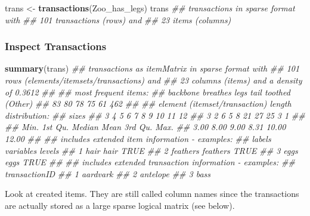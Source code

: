 \documentclass[
  notitlepage]{book}
\newenvironment{Shaded}{\begin{snugshade}}{\end{snugshade}}
\newcommand{\CommentTok}[1]{\textcolor[rgb]{0.56,0.35,0.01}{\textit{#1}}}
\newcommand{\KeywordTok}[1]{\textcolor[rgb]{0.13,0.29,0.53}{\textbf{#1}}}
\newcommand{\NormalTok}[1]{#1}
\newcommand{\StringTok}[1]{\textcolor[rgb]{0.31,0.60,0.02}{#1}}
\begin{document}
\begin{Shaded}
\begin{Highlighting}[]
\NormalTok{trans \textless{}{-}}\StringTok{ }\KeywordTok{transactions}\NormalTok{(Zoo\_has\_legs)}
\NormalTok{trans}
\CommentTok{\#\# transactions in sparse format with}
\CommentTok{\#\#  101 transactions (rows) and}
\CommentTok{\#\#  23 items (columns)}
\end{Highlighting}
\end{Shaded}

\hypertarget{inspect-transactions}{%
\subsubsection{Inspect Transactions}\label{inspect-transactions}}

\begin{Shaded}
\begin{Highlighting}[]
\KeywordTok{summary}\NormalTok{(trans)}
\CommentTok{\#\# transactions as itemMatrix in sparse format with}
\CommentTok{\#\#  101 rows (elements/itemsets/transactions) and}
\CommentTok{\#\#  23 columns (items) and a density of 0.3612 }
\CommentTok{\#\# }
\CommentTok{\#\# most frequent items:}
\CommentTok{\#\# backbone breathes     legs     tail  toothed  (Other) }
\CommentTok{\#\#       83       80       78       75       61      462 }
\CommentTok{\#\# }
\CommentTok{\#\# element (itemset/transaction) length distribution:}
\CommentTok{\#\# sizes}
\CommentTok{\#\#  3  4  5  6  7  8  9 10 11 12 }
\CommentTok{\#\#  3  2  6  5  8 21 27 25  3  1 }
\CommentTok{\#\# }
\CommentTok{\#\#    Min. 1st Qu.  Median    Mean 3rd Qu.    Max. }
\CommentTok{\#\#    3.00    8.00    9.00    8.31   10.00   12.00 }
\CommentTok{\#\# }
\CommentTok{\#\# includes extended item information {-} examples:}
\CommentTok{\#\#     labels variables levels}
\CommentTok{\#\# 1     hair      hair   TRUE}
\CommentTok{\#\# 2 feathers  feathers   TRUE}
\CommentTok{\#\# 3     eggs      eggs   TRUE}
\CommentTok{\#\# }
\CommentTok{\#\# includes extended transaction information {-} examples:}
\CommentTok{\#\#   transactionID}
\CommentTok{\#\# 1      aardvark}
\CommentTok{\#\# 2      antelope}
\CommentTok{\#\# 3          bass}
\end{Highlighting}
\end{Shaded}

Look at created items. They are still called column names since the
transactions are actually stored as a large sparse logical matrix (see
below).
\end{document}
